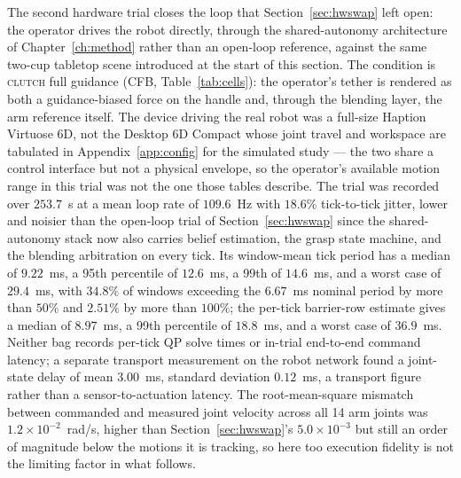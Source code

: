 \documentclass[12pt,a4paper,twoside,openright]{report}
\begin{document}
The second hardware trial closes the loop that Section~\ref{sec:hwswap} left open: the operator drives the robot directly, through the shared-autonomy architecture of Chapter~\ref{ch:method} rather than an open-loop reference, against the same two-cup tabletop scene introduced at the start of this section. The condition is \textsc{clutch} full guidance (CFB, Table~\ref{tab:cells}): the operator's tether is rendered as both a guidance-biased force on the handle and, through the blending layer, the arm reference itself. The device driving the real robot was a full-size Haption Virtuose 6D, not the Desktop 6D Compact whose joint travel and workspace are tabulated in Appendix~\ref{app:config} for the simulated study --- the two share a control interface but not a physical envelope, so the operator's available motion range in this trial was not the one those tables describe. The trial was recorded over $253.7$~s at a mean loop rate of $109.6$~Hz with $18.6\%$ tick-to-tick jitter, lower and noisier than the open-loop trial of Section~\ref{sec:hwswap} since the shared-autonomy stack now also carries belief estimation, the grasp state machine, and the blending arbitration on every tick. Its window-mean tick period has a median of $9.22$~ms, a 95th percentile of $12.6$~ms, a 99th of $14.6$~ms, and a worst case of $29.4$~ms, with $34.8\%$ of windows exceeding the $6.67$~ms nominal period by more than $50\%$ and $2.51\%$ by more than $100\%$; the per-tick barrier-row estimate gives a median of $8.97$~ms, a 99th percentile of $18.8$~ms, and a worst case of $36.9$~ms. Neither bag records per-tick QP solve times or in-trial end-to-end command latency; a separate transport measurement on the robot network found a joint-state delay of mean $3.00$~ms, standard deviation $0.12$~ms, a transport figure rather than a sensor-to-actuation latency. The root-mean-square mismatch between commanded and measured joint velocity across all 14 arm joints was $1.2\times10^{-2}$~rad/s, higher than Section~\ref{sec:hwswap}'s $5.0\times10^{-3}$ but still an order of magnitude below the motions it is tracking, so here too execution fidelity is not the limiting factor in what follows.
\end{document}
